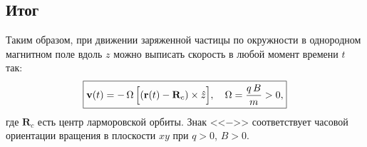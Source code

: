 \documentclass{article}
\begin{document}
\subsection*{Итог}

Таким образом, при движении заряженной частицы по окружности в однородном магнитном поле вдоль \(z\) можно выписать скорость в любой момент времени \(t\) так:
\[
\boxed{
\mathbf{v}(t)
=
-\,\Omega \,\Bigl[(\mathbf{r}(t) - \mathbf{R}_c)\times \hat{z}\Bigr],
\quad
\Omega = \frac{q\,B}{m}>0,
}
\]
где \(\mathbf{R}_c\) есть центр ларморовской орбиты. Знак <<\(-\)>> соответствует часовой ориентации вращения в плоскости \(xy\) при \(q>0\), \(B>0\).


\end{document}
